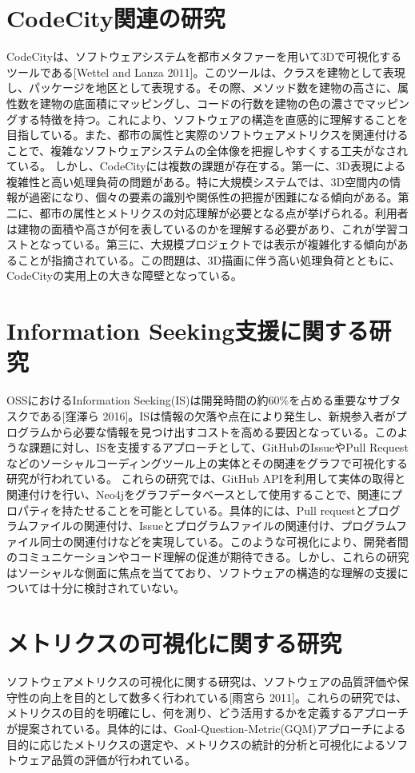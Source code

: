 \documentclass[12pt,twoside]{jbook}
\begin{document}
\section{CodeCity関連の研究}
CodeCityは、ソフトウェアシステムを都市メタファーを用いて3Dで可視化するツールである[Wettel and Lanza 2011]。このツールは、クラスを建物として表現し、パッケージを地区として表現する。その際、メソッド数を建物の高さに、属性数を建物の底面積にマッピングし、コードの行数を建物の色の濃さでマッピングする特徴を持つ。これにより、ソフトウェアの構造を直感的に理解することを目指している。また、都市の属性と実際のソフトウェアメトリクスを関連付けることで、複雑なソフトウェアシステムの全体像を把握しやすくする工夫がなされている。
しかし、CodeCityには複数の課題が存在する。第一に、3D表現による複雑性と高い処理負荷の問題がある。特に大規模システムでは、3D空間内の情報が過密になり、個々の要素の識別や関係性の把握が困難になる傾向がある。第二に、都市の属性とメトリクスの対応理解が必要となる点が挙げられる。利用者は建物の面積や高さが何を表しているのかを理解する必要があり、これが学習コストとなっている。第三に、大規模プロジェクトでは表示が複雑化する傾向があることが指摘されている。この問題は、3D描画に伴う高い処理負荷とともに、CodeCityの実用上の大きな障壁となっている。

\section{Information Seeking支援に関する研究}
OSSにおけるInformation Seeking(IS)は開発時間の約60\%を占める重要なサブタスクである[窪澤ら 2016]。ISは情報の欠落や点在により発生し、新規参入者がプログラムから必要な情報を見つけ出すコストを高める要因となっている。このような課題に対し、ISを支援するアプローチとして、GitHubのIssueやPull Requestなどのソーシャルコーディングツール上の実体とその関連をグラフで可視化する研究が行われている。
これらの研究では、GitHub APIを利用して実体の取得と関連付けを行い、Neo4jをグラフデータベースとして使用することで、関連にプロパティを持たせることを可能としている。具体的には、Pull requestとプログラムファイルの関連付け、Issueとプログラムファイルの関連付け、プログラムファイル同士の関連付けなどを実現している。このような可視化により、開発者間のコミュニケーションやコード理解の促進が期待できる。しかし、これらの研究はソーシャルな側面に焦点を当てており、ソフトウェアの構造的な理解の支援については十分に検討されていない。

\section{メトリクスの可視化に関する研究}
ソフトウェアメトリクスの可視化に関する研究は、ソフトウェアの品質評価や保守性の向上を目的として数多く行われている[雨宮ら 2011]。これらの研究では、メトリクスの目的を明確にし、何を測り、どう活用するかを定義するアプローチが提案されている。具体的には、Goal-Question-Metric(GQM)アプローチによる目的に応じたメトリクスの選定や、メトリクスの統計的分析と可視化によるソフトウェア品質の評価が行われている。
\end{document}
